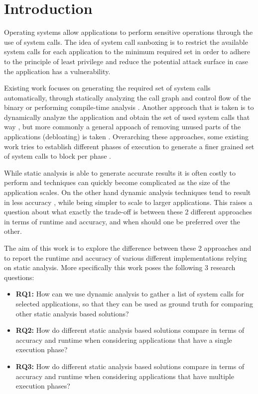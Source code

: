 \section{Introduction}
Operating systems allow applications to perform sensitive operations through the use of system calls. The idea of system call sanboxing is to restrict the available system calls for each application to the minimum required set in order to adhere to the principle of least privilege and reduce the potential attack surface in case the application has a vulnerability.

Existing work focuses on generating the required set of system calls automatically, through statically analyzing the call graph and control flow of the binary or performing compile-time analysis \cite{ref_sp_1} \cite{ref_sp_3} \cite{ref_sp_2}.
Another approach that is taken is to dynamically analyze the application and obtain the set of used system calls that way \cite{ref_dyn_1}, but more commonly a general appoach of removing unused parts of the applications (debloating) is taken \cite{ref_debloat_1} \cite{ref_debloat_2}. %
Overarching these approaches, some existing work tries to establish different phases of execution to generate a finer grained set of system calls to block per phase \cite{ref_mp_1}.

While static analysis is able to generate accurate results it is often costly to perform \cite{ref_sp_1} and techniques can quickly become complicated as the size of the application scales.
On the other hand dynamic analysis techniques tend to result in less accuracy \cite{ref_sp_3}, while being simpler to scale to larger applications.
This raises a question about what exactly the trade-off is between these 2 different approaches in terms of runtime and accuracy, and when should one be preferred over the other.

The aim of this work is to explore the difference between these 2 approaches and to report the runtime and accuracy of various different implementations relying on static analysis.
More specifically this work poses the following 3 research questions:
\begin{itemize}
    \item{\textbf{RQ1:} How can we use dynamic analysis to gather a list of system calls for selected applications, so that they can be used as ground truth for comparing other static analysis based solutions?}
    \item{\textbf{RQ2:} How do different static analysis based solutions compare in terms of accuracy and runtime when considering applications that have a single execution phase?}
    \item{\textbf{RQ3:} How do different static analysis based solutions compare in terms of accuracy and runtime when considering applications that have multiple execution phases?}
\end{itemize}

